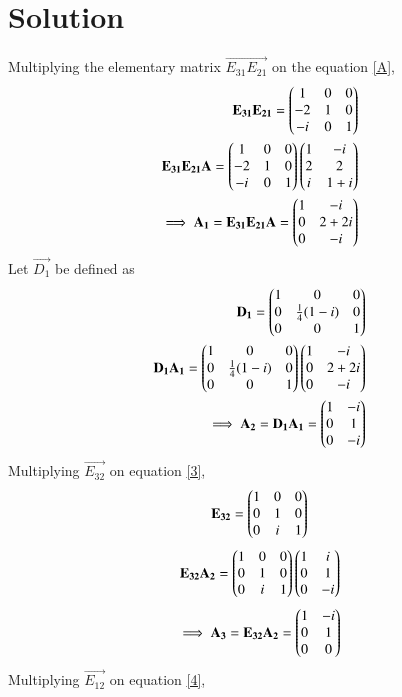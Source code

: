 \documentclass[journal,12pt,twocolumn]{IEEEtran}
\begin{document}
\section{Solution}
Multiplying the elementary matrix $\vec{E_{31}E_{21}}$ on the equation \eqref{A},
\begin{align}
\mathbf{E_{31}E_{21}} = \begin{pmatrix}1&0&0\\-2&1&0\\-i&0&1\end{pmatrix}\\
\mathbf{E_{31}E_{21}A} =   \begin{pmatrix}1&0&0\\-2&1&0\\-i&0&1\end{pmatrix}\begin{pmatrix}1&-i\\2&2\\i& 1+i\end{pmatrix}\\
\implies\mathbf{A_1} = \mathbf{E_{31}E_{21}A} = \begin{pmatrix}1&-i\\0&2+2i\\0&-i\end{pmatrix}\label{2}
\end{align}
 Let $\vec{D_1}$ be defined as 
\begin{align}
\mathbf{D_1} = \begin{pmatrix}1&0&0\\0&\frac{1}{4}(1-i)&0\\0&0&1\end{pmatrix}\\
\mathbf{D_1A_1} = \begin{pmatrix}1&0&0\\0&\frac{1}{4}(1-i)&0\\0&0&1\end{pmatrix}\begin{pmatrix}1&-i\\0&2+2i\\0&-i\end{pmatrix}\\
\implies \mathbf{A_2}=\mathbf{D_1A_1} = \begin{pmatrix}1&-i\\0&1\\0&-i\end{pmatrix}\label{3}
\end{align}
Multiplying $\vec{E_{32}}$ on equation \eqref{3},
\begin{align}
\mathbf{E_{32}} = \begin{pmatrix}1&0&0\\0&1&0\\0&i&1\end{pmatrix}
\end{align}
\begin{align}
\mathbf{E_{32}A_2} = \begin{pmatrix}1&0&0\\0&1&0\\0&i&1\end{pmatrix}\begin{pmatrix}1&i\\0&1\\0&-i\end{pmatrix}
\end{align}
\begin{align}
\implies \mathbf{A_3}=\mathbf{E_{32}A_2} = \begin{pmatrix}1&-i\\0&1\\0&0\end{pmatrix}\label{4}
\end{align}
Multiplying $\vec{E_{12}}$ on equation \eqref{4},
\end{document}
